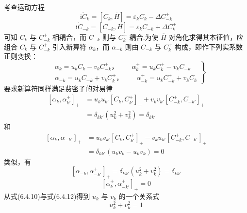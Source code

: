 考查运动方程
\begin{equation}
  \mathrm{i}\dot{C}_{k}=\left[C_{k},\overline{H}\right]
  =\varepsilon_{k}C_{k}-\Delta C^{+}_{-k}
\end{equation}
\begin{equation}
  \mathrm{i}\dot{C}_{-k}=\left[C_{-k},\overline{H}\right]
  =\varepsilon_{k}C_{-k}+\Delta C^{+}_{k}
\end{equation}
可知 $C_{k}$ 与 $C^{+}_{-k}$ 相耦合，而 $C_{-k}$ 则与 $C^{+}_{k}$ 耦合.为使 $\overline{H}$ 对角化求得其本征值，应组合 $C_{k}$ 与 $C^{+}_{-k}$ 引入新算符 $\alpha_{k}$，而 $\alpha_{-k}$ 则由 $C_{-k}$ 与 $C^{+}_{k}$ 构成，即作下列实系数正则变换：
\begin{equation}
  \left.
  \begin{aligned}
    &\alpha_{k}=u_{k}C_{k}-v_{k}C^{+}_{-k}\text{，}
    \qquad \alpha^{+}_{k}=u_{k}C^{+}_{k}-v_{k}C_{-k}\\
    &\alpha_{-k}=u_{k}C_{-k}+v_{k}C^{+}_{k}\text{，}
    \qquad \alpha^{+}_{-k}=u_{k}C^{+}_{-k}+v_{k}C_{k}
  \end{aligned}\right\}
\end{equation}
要求新算符同样满足费密子的对易律
\begin{equation}
\begin{aligned}
  \left[\alpha_{k},\alpha^{+}_{k'}\right]_{+}
  &=u_{k}u_{k'}\left[C_{k},C^{+}_{k'}\right]_{+}
  +v_{k}v_{k'}\left[C^{+}_{-k},C_{-k'}\right]_{+}\\
  &=\delta_{kk'}\left(u_{k}^{2}+v_{k}^{2}\right)=\delta_{kk'}
\end{aligned}
\end{equation}
和
\begin{equation}
\begin{aligned}
  \left[\alpha_{k},\alpha_{-k'}\right]_{+}
  &=u_{k}v_{k'}\left[C_{k},C^{+}_{k'}\right]_{+}
  -v_{k}u_{k'}\left[C^{+}_{-k},C_{-k'}\right]_{+}\\
  &=\delta_{kk'}\left(u_{k}v_{k}-u_{k}v_{k}\right)=0
\end{aligned}
\end{equation}
类似，有
\begin{equation}
  \left[\alpha_{-k},\alpha^{+}_{-k'}\right]_{+}
  =\delta_{kk'}\left(u_{k}^{2}+v_{k}^{2}\right)=\delta_{kk'}
\end{equation}
\begin{equation}
  \left[\alpha^{+}_{k},\alpha^{+}_{-k'}\right]_{+}=0
\end{equation}
从式(6.4.10)与式(6.4.12)得到 $u_{k}$ 与 $v_{k}$ 的一个关系式
\begin{equation}
  u_{k}^{2}+v_{k}^{2}=1
\end{equation}
